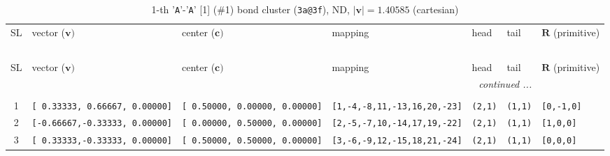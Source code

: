 \documentclass[fleqn,10pt,landscape]{jsarticle}
\begin{document}
\renewcommand{\arraystretch}{1.6}
\begin{longtable}[l]{cllllll}
\captionsetup{justification=raggedright, singlelinecheck=off}
\caption{1-th '\texttt{A}'-'\texttt{A}' [1] (\#1) bond cluster (\texttt{3a@3f}), ND, $|\bm{v}|=1.40585$ (cartesian)}
 \\
 \hline \hline
SL & vector ($\bm{v})$ & center ($\bm{c})$ & mapping & head & tail & $\bm{R}$ (primitive) \\ \hline \endfirsthead

\multicolumn{6}{l}{\tablename\ \thetable{}} \\
 \hline \hline
SL & vector ($\bm{v})$ & center ($\bm{c})$ & mapping & head & tail & $\bm{R}$ (primitive) \\ \hline \endhead

 \hline \hline
\multicolumn{6}{r}{\footnotesize\it continued ...} \\ \endfoot

 \hline \hline
\multicolumn{6}{r}{} \\ \endlastfoot

1 & \texttt{[ 0.33333, 0.66667, 0.00000]} & \texttt{[ 0.50000, 0.00000, 0.00000]} & \texttt{[1,-4,-8,11,-13,16,20,-23]} & \texttt{(2,1)} & \texttt{(1,1)} & \texttt{[0,-1,0]} \\ \hline
2 & \texttt{[-0.66667,-0.33333, 0.00000]} & \texttt{[ 0.00000, 0.50000, 0.00000]} & \texttt{[2,-5,-7,10,-14,17,19,-22]} & \texttt{(2,1)} & \texttt{(1,1)} & \texttt{[1,0,0]} \\ \hline
3 & \texttt{[ 0.33333,-0.33333, 0.00000]} & \texttt{[ 0.50000, 0.50000, 0.00000]} & \texttt{[3,-6,-9,12,-15,18,21,-24]} & \texttt{(2,1)} & \texttt{(1,1)} & \texttt{[0,0,0]} \\
\end{longtable}
\renewcommand{\arraystretch}{1.6}
\end{document}
